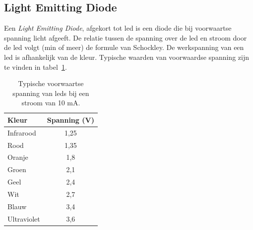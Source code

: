 
\subsection{Light Emitting Diode}
Een \textsl{Light Emitting Diode}, afgekort tot led is een diode die bij voorwaartse spanning licht afgeeft. De relatie tussen de spanning over de led en stroom door de led volgt (min of meer) de formule van Schockley. De werkspanning van een led is afhankelijk van de kleur. Typische waarden van voorwaardse spanning zijn te vinden in tabel~\ref{tab:gelspanningleds}.

\begin{table}[!ht]
\centering
\caption{Typische voorwaartse spanning van leds bij een stroom van 10 mA.}
\label{tab:gelspanningleds}
\begin{tabular}{lc}
\toprule
Kleur & Spanning (V) \\
\midrule
Infrarood & 1,25  \\
Rood      & 1,35  \\
Oranje    & 1,8   \\
Groen     & 2,1   \\
Geel      & 2,4   \\
Wit       & 2,7   \\
Blauw     & 3,4   \\
Ultraviolet & 3,6 \\
\bottomrule
\end{tabular}
\end{table}


